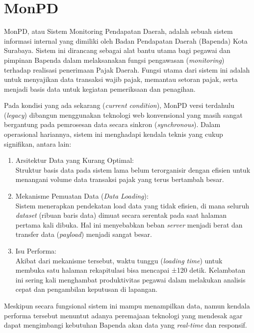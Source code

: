 \section{MonPD}
\label{sec:monpd}

MonPD, atau Sistem Monitoring Pendapatan Daerah, adalah sebuah sistem informasi internal yang dimiliki oleh Badan Pendapatan Daerah (Bapenda) Kota Surabaya. Sistem ini dirancang sebagai alat bantu utama bagi pegawai dan pimpinan Bapenda dalam melaksanakan fungsi pengawasan (\emph{monitoring}) terhadap realisasi penerimaan Pajak Daerah. Fungsi utama dari sistem ini adalah untuk menyajikan data transaksi wajib pajak, memantau setoran pajak, serta menjadi basis data untuk kegiatan pemeriksaan dan penagihan.

Pada kondisi yang ada sekarang (\emph{current condition}), MonPD versi terdahulu (\emph{legacy}) dibangun menggunakan teknologi web konvensional yang masih sangat bergantung pada pemrosesan data secara sinkron (\emph{synchronous}). Dalam operasional hariannya, sistem ini menghadapi kendala teknis yang cukup signifikan, antara lain:

\begin{enumerate}
    \item Arsitektur Data yang Kurang Optimal: \\
    Struktur basis data pada sistem lama belum terorganisir dengan efisien untuk menangani volume data transaksi pajak yang terus bertambah besar.
    \item Mekanisme Pemuatan Data (\emph{Data Loading}): \\
    Sistem menerapkan pendekatan load data yang tidak efisien, di mana seluruh \emph{dataset} (ribuan baris data) dimuat secara serentak pada saat halaman pertama kali dibuka. Hal ini menyebabkan beban \emph{server} menjadi berat dan transfer data (\emph{payload}) menjadi sangat besar.
    \item Isu Performa: \\
    Akibat dari mekanisme tersebut, waktu tunggu (\emph{loading time}) untuk membuka satu halaman rekapitulasi bisa mencapai ±120 detik. Kelambatan ini sering kali menghambat produktivitas pegawai dalam melakukan analisis cepat dan pengambilan keputusan di lapangan.
\end{enumerate}

Meskipun secara fungsional sistem ini mampu menampilkan data, namun kendala performa tersebut menuntut adanya peremajaan teknologi yang mendesak agar dapat mengimbangi kebutuhan Bapenda akan data yang \emph{real-time} dan responsif.
